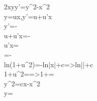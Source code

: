 2xyy'=y^2-x^2 \\
y=ux,y'=u+u'x\\
y'=-\\
u+u'x=-\\
u'x=\\
\int {}=\int -\\
ln(1+u^2)=-ln|x|+c=>ln||+c\\
1+u^2==>1+=\\
y^2=cx-x^2\\
y=\pm {}